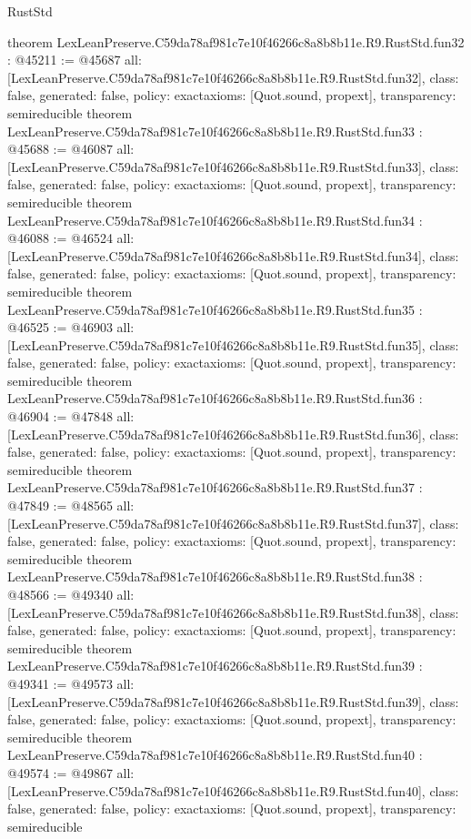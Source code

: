 \begin{lexlean}{RustStd}
\begin{coremodule}
{}
theorem LexLeanPreserve.C59da78af981c7e10f46266c8a8b8b11e.R9.RustStd.fun32 : @45211 := @45687 {
  all: [LexLeanPreserve.C59da78af981c7e10f46266c8a8b8b11e.R9.RustStd.fun32],
  class: false,
  generated: false,
  policy: exact{axioms: [Quot.sound, propext]},
  transparency: semireducible
}
theorem LexLeanPreserve.C59da78af981c7e10f46266c8a8b8b11e.R9.RustStd.fun33 : @45688 := @46087 {
  all: [LexLeanPreserve.C59da78af981c7e10f46266c8a8b8b11e.R9.RustStd.fun33],
  class: false,
  generated: false,
  policy: exact{axioms: [Quot.sound, propext]},
  transparency: semireducible
}
theorem LexLeanPreserve.C59da78af981c7e10f46266c8a8b8b11e.R9.RustStd.fun34 : @46088 := @46524 {
  all: [LexLeanPreserve.C59da78af981c7e10f46266c8a8b8b11e.R9.RustStd.fun34],
  class: false,
  generated: false,
  policy: exact{axioms: [Quot.sound, propext]},
  transparency: semireducible
}
theorem LexLeanPreserve.C59da78af981c7e10f46266c8a8b8b11e.R9.RustStd.fun35 : @46525 := @46903 {
  all: [LexLeanPreserve.C59da78af981c7e10f46266c8a8b8b11e.R9.RustStd.fun35],
  class: false,
  generated: false,
  policy: exact{axioms: [Quot.sound, propext]},
  transparency: semireducible
}
theorem LexLeanPreserve.C59da78af981c7e10f46266c8a8b8b11e.R9.RustStd.fun36 : @46904 := @47848 {
  all: [LexLeanPreserve.C59da78af981c7e10f46266c8a8b8b11e.R9.RustStd.fun36],
  class: false,
  generated: false,
  policy: exact{axioms: [Quot.sound, propext]},
  transparency: semireducible
}
theorem LexLeanPreserve.C59da78af981c7e10f46266c8a8b8b11e.R9.RustStd.fun37 : @47849 := @48565 {
  all: [LexLeanPreserve.C59da78af981c7e10f46266c8a8b8b11e.R9.RustStd.fun37],
  class: false,
  generated: false,
  policy: exact{axioms: [Quot.sound, propext]},
  transparency: semireducible
}
theorem LexLeanPreserve.C59da78af981c7e10f46266c8a8b8b11e.R9.RustStd.fun38 : @48566 := @49340 {
  all: [LexLeanPreserve.C59da78af981c7e10f46266c8a8b8b11e.R9.RustStd.fun38],
  class: false,
  generated: false,
  policy: exact{axioms: [Quot.sound, propext]},
  transparency: semireducible
}
theorem LexLeanPreserve.C59da78af981c7e10f46266c8a8b8b11e.R9.RustStd.fun39 : @49341 := @49573 {
  all: [LexLeanPreserve.C59da78af981c7e10f46266c8a8b8b11e.R9.RustStd.fun39],
  class: false,
  generated: false,
  policy: exact{axioms: [Quot.sound, propext]},
  transparency: semireducible
}
theorem LexLeanPreserve.C59da78af981c7e10f46266c8a8b8b11e.R9.RustStd.fun40 : @49574 := @49867 {
  all: [LexLeanPreserve.C59da78af981c7e10f46266c8a8b8b11e.R9.RustStd.fun40],
  class: false,
  generated: false,
  policy: exact{axioms: [Quot.sound, propext]},
  transparency: semireducible
}
\end{coremodule}
\end{lexlean}
